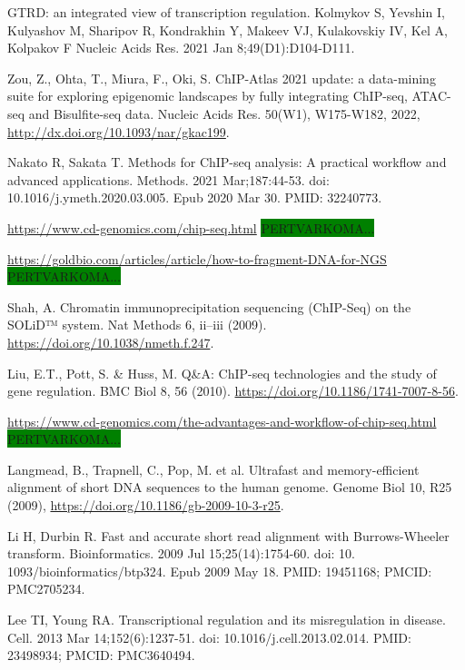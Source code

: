 \documentclass[12pt]{article}
\begin{document}

\begin{thebibliography}{99}

 GTRD: an integrated view of transcription regulation.
Kolmykov S, Yevshin I, Kulyashov M, Sharipov R, Kondrakhin Y, Makeev VJ,
Kulakovskiy IV, Kel A, Kolpakov F Nucleic Acids Res. 2021 Jan
8;49(D1):D104-D111.

 Zou, Z., Ohta, T., Miura, F., Oki, S. ChIP-Atlas 2021
update: a data-mining suite for exploring epigenomic landscapes by fully
integrating ChIP-seq, ATAC-seq and Bisulfite-seq data. Nucleic Acids Res.
50(W1), W175-W182, 2022, \newline
\url{http://dx.doi.org/10.1093/nar/gkac199}.

 Nakato R, Sakata T. Methods for ChIP-seq analysis: A
practical workflow and advanced applications. Methods. 2021 Mar;187:44-53.
doi: 10.1016/j.ymeth.2020.03.005. Epub 2020 Mar 30. PMID: 32240773.

 \url{https://www.cd-genomics.com/chip-seq.html}
\colorbox{green}{PERTVARKOMA...}

\url{https://goldbio.com/articles/article/how-to-fragment-DNA-for-NGS}
\colorbox{green}{PERTVARKOMA...}

 Shah, A. Chromatin immunoprecipitation sequencing (ChIP-Seq)
on the SOLiD™ system. Nat Methods 6, ii–iii (2009).
\url{https://doi.org/10.1038/nmeth.f.247}.

 Liu, E.T., Pott, S. \& Huss, M. Q\&A: ChIP-seq technologies
and the study of gene regulation. BMC Biol 8, 56 (2010).
\url{https://doi.org/10.1186/1741-7007-8-56}.

 \url{https://www.cd-genomics.com/the-advantages-and-workflow-of-chip-seq.html}
\colorbox{green}{PERTVARKOMA...}

 Langmead, B., Trapnell, C., Pop, M. et al. Ultrafast and
memory-efficient alignment of short DNA sequences to the human genome. Genome
Biol 10, R25 (2009), \newline
\url{https://doi.org/10.1186/gb-2009-10-3-r25}.

 Li H, Durbin R. Fast and accurate short read alignment with
Burrows-Wheeler transform. Bioinformatics. 2009 Jul 15;25(14):1754-60. doi: 10.
1093/bioinformatics/btp324. Epub 2009 May 18. PMID: 19451168; PMCID: PMC2705234.

 Lee TI, Young RA. Transcriptional regulation and its
misregulation in disease. Cell. 2013 Mar 14;152(6):1237-51.
doi: 10.1016/j.cell.2013.02.014. PMID: 23498934; PMCID: PMC3640494.


\end{thebibliography}
\end{document}

